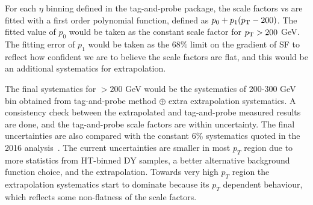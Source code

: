 For each $\eta$ binning defined in the tag-and-probe package, the scale factors vs \pt are fitted with a first order polynomial function, defined
as $p_0 + p_1(p_{\mathrm{T}}-200)$. The fitted value of $p_0$ would be taken as the constant scale factor for $p_{\mathrm{T}} > 200$ GeV. The fitting error of $p_1$ would be taken as the $68\%$ limit on the gradient of SF to reflect how confident we are to believe the scale factors are flat, and this would be an additional systematics for extrapolation.

The final systematics for \pt$ > 200$ GeV would be the systematics of 200-300 GeV \pt bin obtained from tag-and-probe method $\oplus$ extra extrapolation systematics. A consistency check between the extrapolated and tag-and-probe measured results
are done, and the tag-and-probe scale factors are within uncertainty. The final uncertainties are also compared with the constant 6\% systematics
quoted in the 2016 analysis~\cite{CMS_AN_2017-027}. The current uncertainties are smaller in most $p_{T}$ region due to more statistics from
HT-binned DY samples, a better alternative background function choice, and the extrapolation. Towards very high $p_{T}$ region the extrapolation
systematics start to dominate because its $p_{T}$ dependent behaviour, which reflects some non-flatness of the scale factors.



